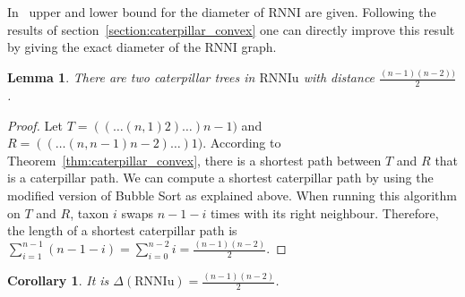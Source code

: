 \documentclass[11pt, a4paper]{article}
\newcommand{\rnni}{\mathrm{RNNI}}
\newcommand{\rnniu}{\mathrm{RNNIu}}
\newtheorem{lemma}[definition]{Lemma}
\newtheorem{corollary}[definition]{Corollary}
\begin{document}
In~\cite{Gavryushkin2017} upper and lower bound for the diameter of $\rnni$ are given.
Following the results of section~\ref{section:caterpillar_convex} one can directly improve this result by giving the exact diameter of the $\rnni$ graph.

\begin{lemma}
	There are two caterpillar trees in $\rnniu$ with distance $\frac{(n-1)(n-2))}{2}$.
	\label{conj:caterpillar_diameter}
\end{lemma}


\begin{proof}
	Let $T = (( \dots (n,1)2)\dots)n-1)$ and $R = (( \dots (n,n-1)n-2)\dots)1)$.
    According to Theorem~\ref{thm:caterpillar_convex}, there is a shortest path between $T$ and $R$ that is a caterpillar path.
    We can compute a shortest caterpillar path by using the modified version of Bubble Sort as explained above. 
    When running this algorithm on $T$ and $R$, taxon $i$ swaps $n-1-i$ times with its right neighbour.
    Therefore, the length of a shortest caterpillar path is $\sum\limits_{i=1}^{n-1}(n-1-i) = \sum\limits_{i=0}^{n-2}i = \frac{(n-1)(n-2)}{2}$.
\end{proof}

\begin{corollary}
    It is $\Delta(\rnniu) = \frac{(n-1)(n-2)}{2}$.
\end{corollary}

\end{document}
